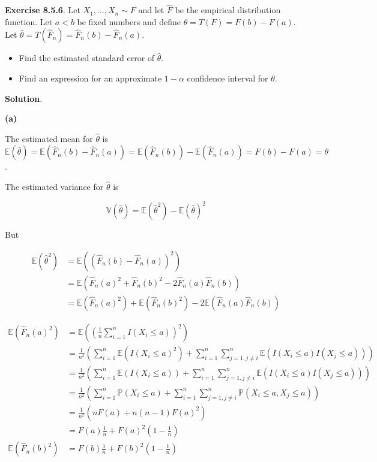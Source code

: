 \textbf{Exercise 8.5.6}. Let \(X_{1}, \dots, X_{n} \sim F\) and let
\(\hat{F}\) be the empirical distribution function. Let \(a < b\) be
fixed numbers and define \(\theta = T(F) = F(b) - F(a)\). Let
\(\hat{\theta} = T(\hat{F}_{n}) = \hat{F}_{n}(b) - \hat{F}_{n}(a)\).

\begin{itemize}[tightlist]
\item
  Find the estimated standard error of \(\hat{\theta}\).
\item
  Find an expression for an approximate \(1 - \alpha\) confidence
  interval for \(\theta\).
\end{itemize}

\textbf{Solution}.

\textbf{(a)}

The estimated mean for \(\hat{\theta}\) is
\(\mathbb{E}(\hat{\theta}) = \mathbb{E}(\hat{F}_{n}(b) - \hat{F}_{n}(a)) = \mathbb{E}(\hat{F}_{n}(b)) - \mathbb{E}(\hat{F}_{n}(a)) = F(b) - F(a) = \theta\).

The estimated variance for \(\hat{\theta}\) is

\[ \mathbb{V}(\hat{\theta}) = \mathbb{E}(\hat{\theta}^{2}) - \mathbb{E}(\hat{\theta})^{2} \]

But

\begin{align*}
\mathbb{E}(\hat{\theta}^{2}) & = \mathbb{E}((\hat{F}_{n}(b) - \hat{F}_{n}(a))^{2})  \\
&= \mathbb{E}(\hat{F}_{n}(a)^{2} + \hat{F}_{n}(b)^{2} - 2 \hat{F}_{n}(a)\hat{F}_{n}(b)) \\
&= \mathbb{E}(\hat{F}_{n}(a)^{2}) + \mathbb{E}(\hat{F}_{n}(b)^{2}) - 2 \mathbb{E}(\hat{F}_{n}(a)\hat{F}_{n}(b))
\end{align*}

\begin{align*}
\mathbb{E}(\hat{F}_{n}(a)^{2}) & = \mathbb{E}\left(\left(\frac{1}{n} \sum_{i=1}^{n} I(X_{i} \leq a)\right)^{2}\right) \\
& = \frac{1}{n^{2}} \left(\sum_{i=1}^{n} \mathbb{E} \left( I(X_{i} \leq a)^{2} \right) + \sum_{i=1}^{n} \sum_{j=1, j \neq i}^{n} \mathbb{E}\left( I(X_{i} \leq a) I(X_{j} \leq a) \right) \right) \\
& = \frac{1}{n^{2}} \left(\sum_{i=1}^{n} \mathbb{E} \left( I(X_{i} \leq a) \right) + \sum_{i=1}^{n} \sum_{j=1, j \neq i}^{n} \mathbb{E}\left( I(X_{i} \leq a) I(X_{j} \leq a) \right) \right) \\
& = \frac{1}{n^{2}} \left(\sum_{i=1}^{n} \mathbb{P} \left( X_{i} \leq a \right) + \sum_{i=1}^{n} \sum_{j=1, j \neq i}^{n} \mathbb{P}\left( X_{i} \leq a, X_{j} \leq a \right) \right) \\
& = \frac{1}{n^{2}} \left(n F(a) + n(n-1) F(a)^{2} \right) \\
&= F(a) \frac{1}{n} + F(a)^{2} \left(1 - \frac{1}{n} \right) \\
\mathbb{E}(\hat{F}_{n}(b)^{2}) & = F(b) \frac{1}{n} + F(b)^{2} \left(1 - \frac{1}{n} \right)
\end{align*}

